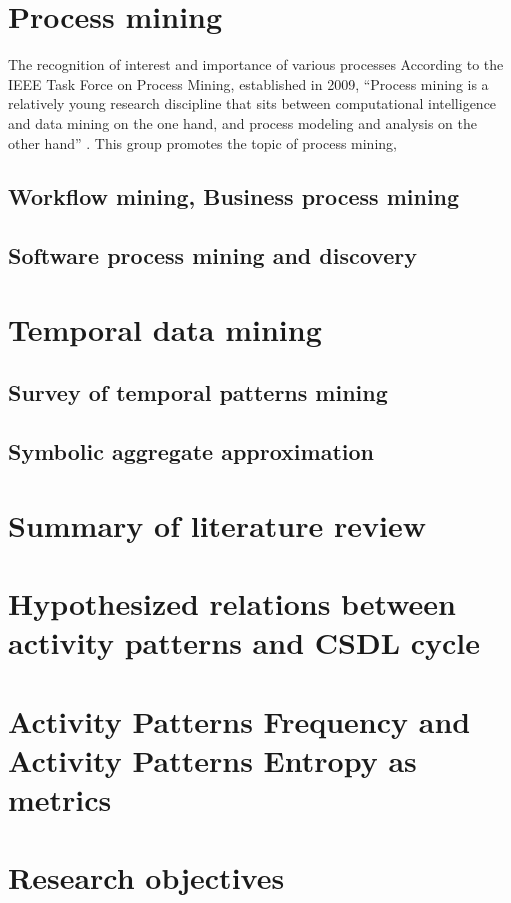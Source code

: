 \section{Process mining}
The recognition of interest and importance of various processes 
According to the IEEE Task Force on Process Mining, established in 2009, ``Process mining is 
a relatively young research discipline that sits between computational intelligence and data 
mining on the one hand, and process modeling and analysis on the other hand'' \cite{citeulike:11077707}.
This group promotes the topic of process mining,

\subsection{Workflow mining, Business process mining}\label{mackground.bpm}


\subsection{Software process mining and discovery}\label{mackground.bpm}


\section{Temporal data mining}
\subsection{Survey of temporal patterns mining}
\subsection{Symbolic aggregate approximation}

\section{Summary of literature review}

\section{Hypothesized relations between activity patterns and CSDL cycle}

\section{Activity Patterns Frequency and Activity Patterns Entropy as metrics}

\section{Research objectives}